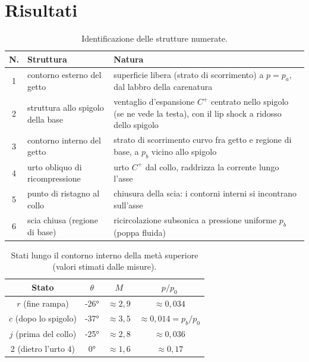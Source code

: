 \documentclass[11pt,a4paper]{article}
\newcommand{\Cp}{C^{+}}
\begin{document}
\section{Risultati}
\begin{table}[H]
  \centering
  \small
  \begin{tabular}{clp{7.2cm}}
    \toprule
    N. & Struttura & Natura \\
    \midrule
    1 & contorno esterno del getto & superficie libera (strato di scorrimento) a $p=p_a$, dal labbro della carenatura \\
    2 & struttura allo spigolo della base & ventaglio d'espansione $\Cp$ centrato nello spigolo (se ne vede la testa),
        con il lip shock a ridosso dello spigolo \\
    3 & contorno interno del getto & strato di scorrimento curvo fra getto e regione di base, a $p_b$ vicino allo
        spigolo \\
    4 & urto obliquo di ricompressione & urto $\Cp$ dal collo, raddrizza la corrente lungo l'asse \\
    5 & punto di ristagno al collo & chiusura della scia: i contorni interni si incontrano sull'asse \\
    6 & scia chiusa (regione di base) & ricircolazione subsonica a pressione uniforme $p_b$ (poppa fluida) \\
    \bottomrule
  \end{tabular}
  \caption{Identificazione delle strutture numerate.}
\end{table}

\begin{table}[H]
  \centering
  \begin{tabular}{cccc}
    \toprule
    Stato & $\theta$ & $M$ & $p/p_0$ \\
    \midrule
    $r$ (fine rampa) & \ang{-26} & $\approx2{,}9$ & $\approx0{,}034$ \\
    $c$ (dopo lo spigolo) & \ang{-37} & $\approx3{,}5$ & $\approx0{,}014=p_b/p_0$ \\
    $j$ (prima del collo) & \ang{-25} & $\approx2{,}8$ & $\approx0{,}036$ \\
    2 (dietro l'urto 4) & \ang{0} & $\approx1{,}6$ & $\approx0{,}17$ \\
    \bottomrule
  \end{tabular}
  \caption{Stati lungo il contorno interno della metà superiore (valori stimati dalle misure).}
\end{table}

\end{document}
